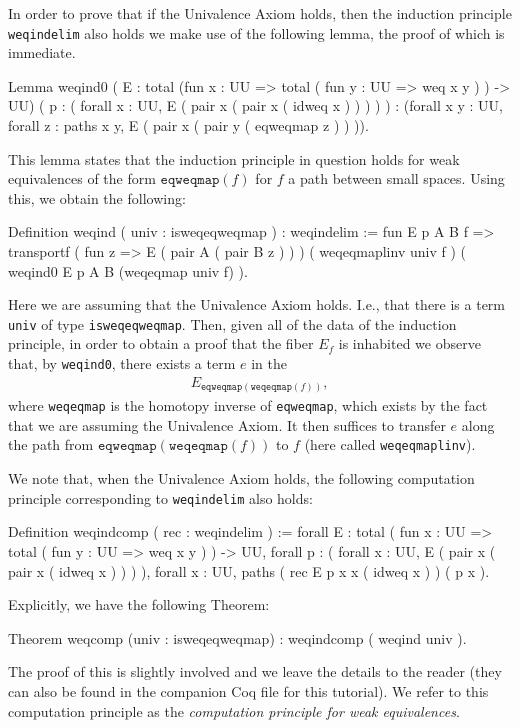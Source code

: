 In order to prove that if the Univalence Axiom holds, then the
induction principle \verb|weqindelim| also holds we make use of
the following lemma, the proof of which is immediate.
\begin{center}
  \begin{coqcode}
Lemma weqind0 
( E : total (fun x : UU => total ( fun y : UU => weq x y ) ) -> UU) 
( p : ( forall x : UU, E ( pair x ( pair x ( idweq x ) ) ) ) ) : 
(forall x y : UU,
  forall z : paths x y, E ( pair x ( pair y ( eqweqmap z ) ) )).    
  \end{coqcode}
\end{center}
This lemma states that the induction principle in question holds for
weak equivalences of the form $\texttt{eqweqmap}(f)$ for $f$ a path
between small spaces.  Using this, we obtain the following:
\begin{center}
  \begin{coqcode}
Definition weqind ( univ : isweqeqweqmap ) : weqindelim := 
fun E p A B f => 
 transportf ( fun z => E ( pair A ( pair B z ) ) )
  ( weqeqmaplinv univ f ) ( weqind0 E p A B (weqeqmap univ f) ). 
  \end{coqcode}
\end{center}
Here we are assuming that the Univalence Axiom holds.
I.e., that there is a term \verb|univ| of type
\verb|isweqeqweqmap|.  Then, given all of the data of the
induction principle, in order to obtain a proof that the fiber $E_{f}$
is inhabited we observe that, by \verb|weqind0|, there exists a
term $e$ in the 
\begin{align*}
  E_{\texttt{eqweqmap}(\texttt{weqeqmap}(f))},
\end{align*}
where \verb|weqeqmap| is the homotopy inverse of 
\verb|eqweqmap|, which exists by the fact that we are assuming
the Univalence Axiom.  It then suffices to transfer $e$ along the path
from $\texttt{eqweqmap}(\texttt{weqeqmap}(f))$ to $f$ (here called
\verb|weqeqmaplinv|). 

We note that, when the Univalence Axiom holds, the following
computation principle corresponding to \verb|weqindelim| also holds:
\begin{center}
  \begin{coqcode}
Definition weqindcomp ( rec : weqindelim ) := 
forall  E :
 total ( fun x : UU => total ( fun y : UU => weq x y ) ) -> UU, 
forall p : ( forall x : UU, E ( pair x ( pair x ( idweq x ) ) ) ), 
forall x : UU, paths ( rec E p x x ( idweq x ) ) ( p x ).
  \end{coqcode}
\end{center}
Explicitly, we have the following Theorem:
\begin{center}
  \begin{coqcode}
Theorem weqcomp (univ : isweqeqweqmap) : weqindcomp ( weqind univ ).
  \end{coqcode}
\end{center}
The proof of this is slightly involved and we leave the details to the
reader (they can also be found in the companion Coq file for this
tutorial).  We refer to this computation principle as the
\emph{computation principle for weak equivalences}.

